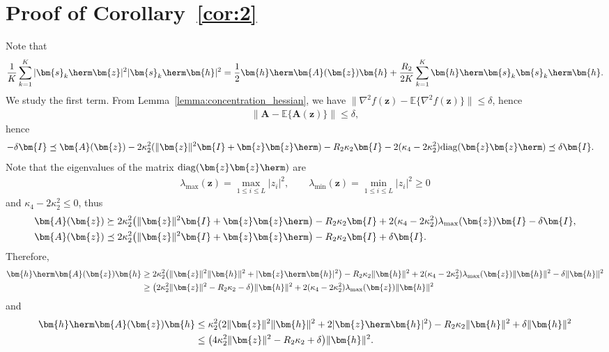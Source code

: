 \section{Proof of Corollary~\ref{cor:2}}\label{appdx:corolary2}
Note that
\begin{align}
\frac{1}{K}\sum_{k=1}^K|\bm{s}_k\herm\bm{z}|^2|\bm{s}_k\herm\bm{h}|^2=\frac{1}{2}\bm{h}\herm\bm{A}(\bm{z})\bm{h}+\frac{R_2}{2K}\sum_{k=1}^K\bm{h}\herm\bm{s}_k\bm{s}_k\herm\bm{h}. \label{eqn:cor2_def}
\end{align}
We study the first term. From Lemma~\ref{lemma:concentration_hessian}, we have $\|\nabla^2 f(\bm{z}) - \mathbb{E}\{\nabla^2 f(\bm{z})\}\|\leq\delta$, hence
\begin{align}
\|\bm{A}-\mathbb{E}\{\bm{A}(\bm{z})\}\|\leq\delta,
\end{align}
hence
\begin{align}
-\delta\bm{I}&\preceq\bm{A}(\bm{z}) - 2\kappa_2^2(\|\bm{z}\|^2\bm{I} +\bm{z}\bm{z}\herm)-R_2\kappa_2\bm{I} - 2(\kappa_4-2\kappa_2^2)\mathrm{diag}(\bm{z}\bm{z}\herm)\preceq\delta\bm{I}.
\end{align}
Note that the eigenvalues of the matrix $\mathrm{diag}(\bm{z}\bm{z}\herm)$ are 
\begin{align}
\lambda_{\mathrm{max}}(\bm{z})=\max_{1\leq i\leq L}|z_i|^2,\qquad\lambda_{\mathrm{min}}(\bm{z})=\min_{1\leq i\leq L}|z_i|^2\geq0
\end{align}
and $\kappa_4-2\kappa_2^2\leq0$, thus
\begin{align}
\bm{A}(\bm{z})&\succeq 2\kappa_2^2\big(\|\bm{z}\|^2\bm{I} +\bm{z}\bm{z}\herm\big)-R_2\kappa_2\bm{I}+ 2(\kappa_4-2\kappa_2^2)\lambda_{\mathrm{max}}(\bm{z})\bm{I}-\delta\bm{I}, \\
\bm{A}(\bm{z})&\preceq  2\kappa_2^2\big(\|\bm{z}\|^2\bm{I} +\bm{z}\bm{z}\herm\big)-R_2\kappa_2\bm{I} + \delta\bm{I}.
\end{align}
Therefore,
\begin{align}
\bm{h}\herm\bm{A}(\bm{z})\bm{h}&\geq2\kappa_2^2\big(\|\bm{z}\|^2\|\bm{h}\|^2 +|\bm{z}\herm\bm{h}|^2\big)-R_2\kappa_2\|\bm{h}\|^2+2(\kappa_4-2\kappa_2^2)\lambda_{\mathrm{max}}(\bm{z})\|\bm{h}\|^2-\delta\|\bm{h}\|^2\nonumber\\
&\geq \big(2\kappa_2^2\|\bm{z}\|^2-R_2\kappa_2-\delta\big)\|\bm{h}\|^2+ 2(\kappa_4-2\kappa_2^2)\lambda_{\mathrm{max}}(\bm{z})\|\bm{h}\|^2
\end{align}
and
\begin{align}
\bm{h}\herm\bm{A}(\bm{z})\bm{h}&\leq  \kappa_2^2(2\|\bm{z}\|^2\|\bm{h}\|^2 +2|\bm{z}\herm\bm{h}|^2)-R_2\kappa_2\|\bm{h}\|^2 + \delta\|\bm{h}\|^2\nonumber\\
&\leq \big(4\kappa_2^2\|\bm{z}\|^2 -R_2\kappa_2+ \delta\big)\|\bm{h}\|^2.
\end{align}

